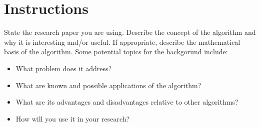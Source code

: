     \section{Instructions}\label{instructions}

    State the research paper you are using. Describe the concept of the
algorithm and why it is interesting and/or useful. If appropriate,
describe the mathematical basis of the algorithm. Some potential topics
for the backgorund include:

\begin{itemize}
\itemsep1pt\parskip0pt
\item
  What problem does it address?
\item
  What are known and possible applications of the algorithm?
\item
  What are its advantages and disadvantages relative to other
  algorithms?
\item
  How will you use it in your research?
\end{itemize}
